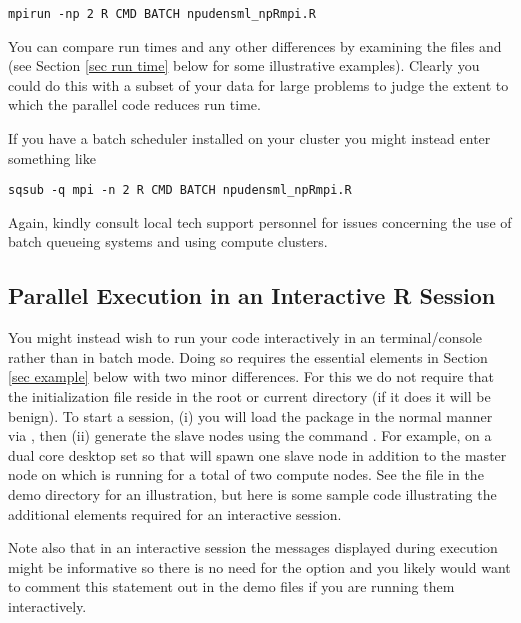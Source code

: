 \documentclass[nojss]{jss}
\begin{document}
\begin{verbatim}
mpirun -np 2 R CMD BATCH npudensml_npRmpi.R
\end{verbatim}

You can compare run times and any other differences by examining the
files  and 
(see Section \ref{sec run time} below for some illustrative
examples). Clearly you could do this with a subset of your data for
large problems to judge the extent to which the parallel code reduces
run time.

If you have a batch scheduler installed on your cluster you might
instead enter something like

\begin{verbatim}
sqsub -q mpi -n 2 R CMD BATCH npudensml_npRmpi.R
\end{verbatim}

Again, kindly consult local tech support personnel for issues
concerning the use of batch queueing systems and using compute
clusters.

\subsection{Parallel Execution in an Interactive R Session}

You might instead wish to run your code interactively in an
 terminal/console rather than in batch mode. Doing so
requires the essential elements in Section \ref{sec example} below
with two minor differences. For this we do not require that the
initialization file  reside in the root or current
directory (if it does it will be benign). To start a session, (i) you
will load the  package in the normal manner via
, then (ii) generate the slave nodes using the
command . For example, on a dual
core desktop set  so that
 will spawn one slave node in
addition to the master node on which  is running for a
total of two compute nodes. See the file  in
the demo directory for an illustration, but here is some sample code
illustrating the additional elements required for an interactive
session.

Note also that in an interactive session the messages displayed during
execution might be informative so there is no need for the option
 and you likely would want to comment
this statement out in the demo files if you are running them
interactively.
\end{document}
